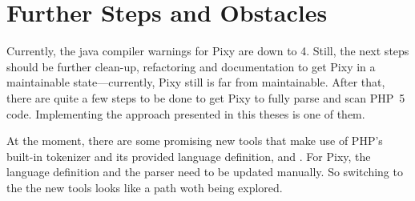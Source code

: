 \section{Further Steps and Obstacles}

Currently, the java compiler warnings for Pixy are down to 4. Still, the next steps should be further clean-up, refactoring and documentation to get Pixy in a maintainable state---currently, Pixy still is far from maintainable. After that, there are quite a few steps to be done to get Pixy to fully parse and scan PHP~5 code. Implementing the approach presented in this theses is one of them.

At the moment, there are some promising new tools that make use of PHP's built-in tokenizer and its provided language definition, \eg \cite{php-parser-popov} and \cite{php-analyzer}. For Pixy, the language definition and the parser need to be updated manually. So switching to the the new tools looks like a path woth being explored.
